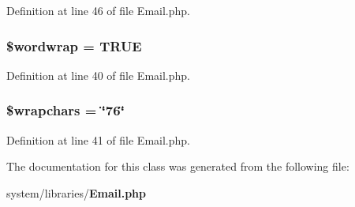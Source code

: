 Definition at line 46 of file Email.\-php.

\subsubsection[{\$wordwrap}]{\setlength{\rightskip}{0pt plus 5cm}\$wordwrap = T\-R\-U\-E}\label{class_c_i___email_abc150a71df67310da874f7399ab5f2cd}


Definition at line 40 of file Email.\-php.

\subsubsection[{\$wrapchars}]{\setlength{\rightskip}{0pt plus 5cm}\$wrapchars = \char`\"{}76\char`\"{}}\label{class_c_i___email_a8834e27a87a8b935ab1155d1d7bd44d2}


Definition at line 41 of file Email.\-php.



The documentation for this class was generated from the following file\-:\begin{DoxyCompactItemize}
\item 
system/libraries/{\bf Email.\-php}\end{DoxyCompactItemize}
